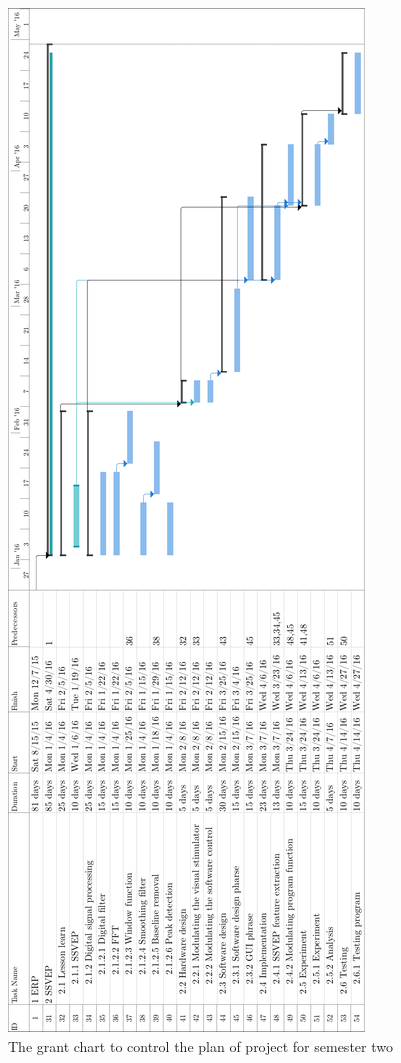 \begin{figure}[ht]
	\centering
	\includegraphics[scale = 0.6]{chapter1/gan2.pdf}
	\caption{The grant chart to control the plan of project for semester two}
\end{figure}

